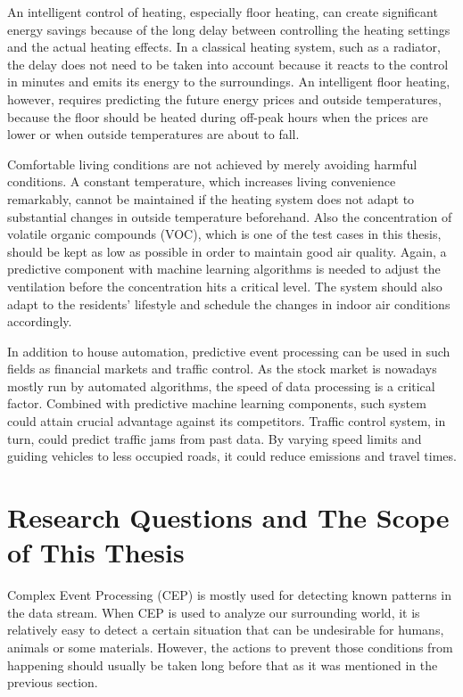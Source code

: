 An intelligent control of heating, especially floor heating, can create significant energy savings because of the long delay between controlling the heating settings and the actual heating effects. In a classical heating system, such as a radiator, the delay does not need to be taken into account because it reacts to the control in minutes and emits its energy to the surroundings. An intelligent floor heating, however, requires predicting the future energy prices and outside temperatures, because the floor should be heated during off-peak hours when the prices are lower or when outside temperatures are about to fall. \cite{Chen11}

Comfortable living conditions are not achieved by merely avoiding harmful conditions. A constant temperature, which increases living convenience remarkably, cannot be maintained if the heating system does not adapt to substantial changes in outside temperature beforehand. Also the concentration of volatile organic compounds (VOC), which is one of the test cases in this thesis, should be kept as low as possible in order to maintain good air quality. Again, a predictive component with machine learning algorithms is needed to adjust the ventilation before the concentration hits a critical level. The system should also adapt to the residents' lifestyle and schedule the changes in indoor air conditions accordingly. \cite{Skon}


In addition to house automation, predictive event processing can be used in such fields as financial markets and traffic control. As the stock market is nowadays mostly run by automated algorithms, the speed of data processing is a critical factor. Combined with predictive machine learning components, such system could attain crucial advantage against its competitors. Traffic control system, in turn, could predict traffic jams from past data. By varying speed limits and guiding vehicles to less occupied roads, it could reduce emissions and travel times. \cite{Bellemans06}


\section{Research Questions and The Scope of This Thesis}
Complex Event Processing (CEP) is mostly used for detecting known patterns in the data stream. When CEP is used to analyze our surrounding world, it is relatively easy to detect a certain situation that can be undesirable for humans, animals or some materials. However, the actions to prevent those conditions from happening should usually be taken long before that as it was mentioned in the previous section.

